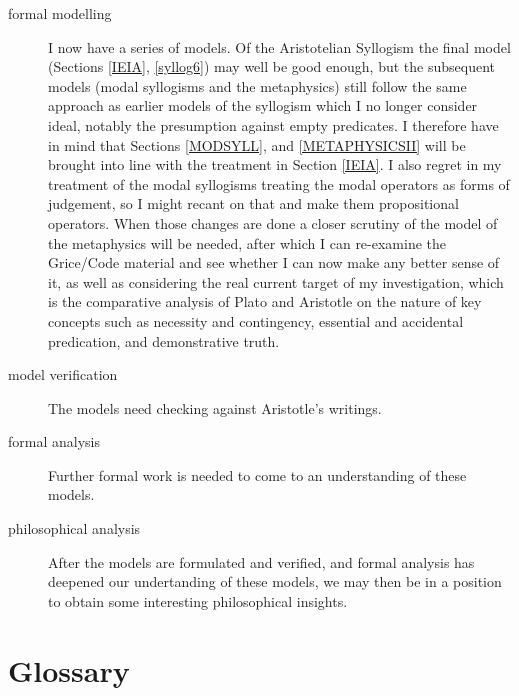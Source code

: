 \begin{description}
\item[formal modelling]
I now have a series of models.
Of the Aristotelian Syllogism the final model (Sections \ref{IEIA}, \ref{syllog6}) may well be good enough, but the subsequent models (modal syllogisms and the metaphysics) still follow the same approach as earlier models of the syllogism which I no longer consider ideal, notably the presumption against empty predicates.
I therefore have in mind that Sections \ref{MODSYLL}, and \ref{METAPHYSICSII} will be brought into line with the treatment in Section \ref{IEIA}.
I also regret in my treatment of the modal syllogisms treating the modal operators as forms of judgement, so I might recant on that and make them propositional operators.
When those changes are done a closer scrutiny of the model of the metaphysics will be needed, after which I can re-examine the Grice/Code material and see whether I can now make any better sense of it, as well as considering the real current target of my investigation, which is the comparative analysis of Plato and Aristotle on the nature of key concepts such as necessity and contingency, essential and accidental predication, and demonstrative truth.

\item[model verification]
The models need checking against Aristotle's writings.

\item[formal analysis]
Further formal work is needed to come to an understanding of these models.

\item[philosophical analysis]
After the models are formulated and verified, and formal analysis has deepened our undertanding of these models, we may then be in a position to obtain some interesting philosophical insights.

\end{description}

\appendix

\vfill

\section{Glossary}




